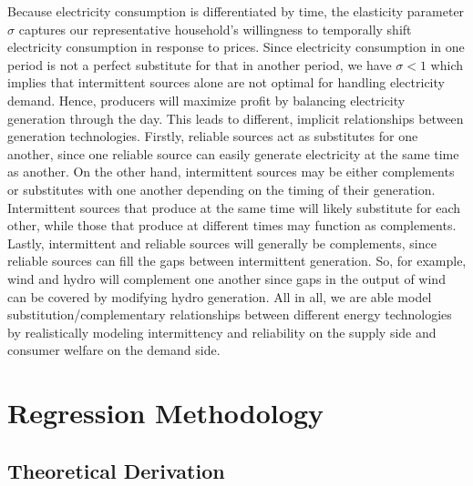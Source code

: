 \documentclass[12pt,a4paper]{extarticle}
\begin{document}
Because electricity consumption is differentiated by time, the elasticity parameter $\sigma$ captures our representative household's willingness to temporally shift electricity consumption in response to prices.  Since electricity consumption in one period is not a perfect substitute for that in another period, we have $\sigma < 1$ which implies that intermittent sources alone are not optimal for handling electricity demand. Hence, producers will maximize profit by balancing electricity generation through the day. This leads to different, implicit relationships between generation technologies. Firstly, reliable sources act as substitutes for one another, since one reliable source can easily generate electricity at the same time as another. On the other hand, intermittent sources may be either complements or substitutes with one another depending on the timing of their generation. Intermittent sources that produce at the same time will likely substitute for each other, while those that produce at different times may function as complements. Lastly, intermittent and reliable sources will generally be complements, since reliable sources can fill the gaps between intermittent generation. So, for example, wind and hydro will complement one another since gaps in the output of wind can be covered by modifying hydro generation. All in all, we are able model substitution/complementary relationships between different energy technologies by realistically modeling intermittency and reliability on the supply side and consumer welfare on the demand side. 

\section{ Regression Methodology}

\subsection{Theoretical Derivation}
\end{document}
